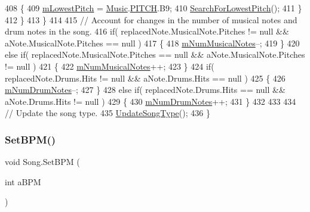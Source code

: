 \begin{DoxyCode}
408                 \{
409                     \hyperlink{group___song_priv_var_ga293976ef4c2050687a81edfbf77b4fc1}{mLowestPitch} = \hyperlink{class_music}{Music}.\hyperlink{group___music_enums_ga508f69b199ea518f935486c990edac1d}{PITCH}.B9;
410                     \hyperlink{group___song_priv_func_gac2e812c6385529eb7a9be5082c7bde75}{SearchForLowestPitch}();
411                 \}
412             \}
413         \}
414 
415         \textcolor{comment}{// Account for changes in the number of musical notes and drum notes in the song.}
416         \textcolor{keywordflow}{if}( replacedNote.MusicalNote.Pitches != null && aNote.MusicalNote.Pitches == null )
417         \{
418             \hyperlink{group___song_priv_var_gaf55b4fd2df0457ba1306a75ac3fdc8b1}{mNumMusicalNotes}--;
419         \}
420         \textcolor{keywordflow}{else} \textcolor{keywordflow}{if}( replacedNote.MusicalNote.Pitches == null && aNote.MusicalNote.Pitches != null )
421         \{
422             \hyperlink{group___song_priv_var_gaf55b4fd2df0457ba1306a75ac3fdc8b1}{mNumMusicalNotes}++;
423         \}
424         \textcolor{keywordflow}{if}( replacedNote.Drums.Hits != null && aNote.Drums.Hits == null )
425         \{
426             \hyperlink{group___song_priv_var_ga3dbce17d96b434d4492280c39cff1778}{mNumDrumNotes}--;
427         \}
428         \textcolor{keywordflow}{else} \textcolor{keywordflow}{if}( replacedNote.Drums.Hits == null && aNote.Drums.Hits != null )
429         \{
430             \hyperlink{group___song_priv_var_ga3dbce17d96b434d4492280c39cff1778}{mNumDrumNotes}++;
431         \}
432 
433 
434         \textcolor{comment}{// Update the song type.}
435         \hyperlink{group___song_priv_func_ga9a1d6eba1576c3631d3c0331196d9ae2}{UpdateSongType}();
436     \}
\end{DoxyCode}
\mbox{\label{group___song_pub_func_gaa65bbba1af7192edff7e0f848029013b}} 
\subsubsection{\texorpdfstring{Set\+B\+P\+M()}{SetBPM()}\hspace{0.1cm}{\footnotesize\ttfamily [1/2]}}
{\footnotesize\ttfamily void Song.\+Set\+B\+PM (\begin{DoxyParamCaption}\item[{int}]{a\+B\+PM }\end{DoxyParamCaption})}



